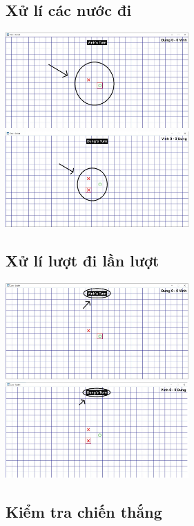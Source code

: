 \documentclass[a4paper]{article}
\begin{document}
\subsection{Xử lí các nước đi}
\includegraphics[width=7cm]{images/app/xuly_luotdi1.png}
\includegraphics[width=7cm]{images/app/xuly-luotdi2.png}

\subsection{Xử lí lượt đi lần lượt}
\includegraphics[width=7cm]{images/app/xuly_buocdi1.png}
\includegraphics[width=7cm]{images/app/xuly_buocdi2.png}

\subsection{Kiểm tra chiến thắng}
\end{document}
